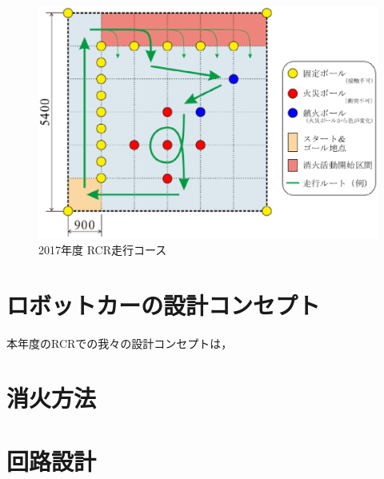 \documentclass[10pt,a4j]{jarticle}
\begin{document}
\begin{figure}[t]
  \begin{center}
    \includegraphics[width=1.0\hsize]{course.eps}
    \caption{2017年度 RCR走行コース}
    \label{course}
  \end{center}
\end{figure}


\newpage
\section{ロボットカーの設計コンセプト}
本年度のRCRでの我々の設計コンセプトは，

\section{消火方法}


\section{回路設計}
\end{document}
